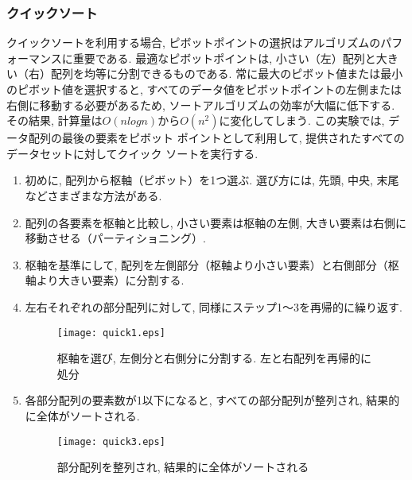 \documentclass[a4j, 12pt]{jarticle}
\begin{document}
\subsubsection{クイックソート}
クイックソートを利用する場合, ピボットポイントの選択はアルゴリズムのパフォーマンスに重要である. 最適なピボットポイントは, 小さい（左）配列と大きい（右）配列を均等に分割できるものである. 常に最大のピボット値または最小のピボット値を選択すると, すべてのデータ値をピボットポイントの左側または右側に移動する必要があるため, ソートアルゴリズムの効率が大幅に低下する. その結果, 計算量は$O(nlogn)$から$O(n^2)$に変化してしまう\cite{gfg:quicksort2025}. この実験では, データ配列の最後の要素をピボット ポイントとして利用して, 提供されたすべてのデータセットに対してクイック ソートを実行する. \\
\begin{enumerate}
  \item 初めに, 配列から枢軸（ピボット）を1つ選ぶ. 選び方には, 先頭, 中央, 末尾などさまざまな方法がある. 
  \item 配列の各要素を枢軸と比較し, 小さい要素は枢軸の左側, 大きい要素は右側に移動させる（パーティショニング）. 
  \item 枢軸を基準にして, 配列を左側部分（枢軸より小さい要素）と右側部分（枢軸より大きい要素）に分割する. 
  \item 左右それぞれの部分配列に対して, 同様にステップ1～3を再帰的に繰り返す. 
  \begin{figure}[H]
    \centering
    \texttt{[image: quick1.eps]}
    \caption{枢軸を選び, 左側分と右側分に分割する. 左と右配列を再帰的に処分}
  \end{figure}
  \item 各部分配列の要素数が1以下になると, すべての部分配列が整列され, 結果的に全体がソートされる. 
  \begin{figure}[H]
    \centering
    \texttt{[image: quick3.eps]}
    \caption{部分配列を整列され, 結果的に全体がソートされる}
  \end{figure}
\end{enumerate}
\end{document}
